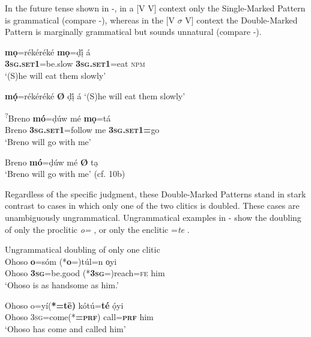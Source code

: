 \documentclass[output=paper]{langsci/langscibook}
\begin{document}
In the future tense shown in -, in a [V V] context only the Single-Marked Pattern is grammatical (compare -), whereas in the [V $\sigma $ V] context the Double-Marked Pattern is marginally grammatical but sounds unnatural (compare -). 

\ea\label{ex:rolle:28}
\gll   *\textbf{mọ}=rékéréké    \textbf{mọ}=ḍị́       á    \\
     \textbf{\textsc{3sg.set1}}=be.slow  \textbf{\textsc{3sg}}\textbf{.}\textbf{\textsc{set1}}=eat  \textsc{npm}\\
\glt ‘(S)he will eat them slowly’
\z

\ea\label{ex:rolle:29}
 \textbf{mọ́}=rékéréké \textbf{Ø} ḍị́ á 
\glt ‘(S)he will eat them slowly’
\z

\ea\label{ex:rolle:30}
\gll   \textsuperscript{?}Breno  \textbf{mó}=ḍúw    mé   \textbf{mọ}=tá    \\
     Breno     \textbf{\textsc{3sg.set1}}=follow  me  \textbf{\textsc{3sg.set1=}}go\\
\glt ‘Breno will go with me’
\z

\ea\label{ex:rolle:31}
   Breno \textbf{mó}=ḍúw mé \textbf{Ø} tạ\\
\glt ‘Breno will go with me’ (cf. 10b)
\z

Regardless of the specific judgment, these Double-Marked Patterns stand in stark contrast to cases in which only one of the two clitics is doubled. These cases are unambiguously ungrammatical. Ungrammatical examples in - show the doubling of only the proclitic \textit{o=} , or only the enclitic =\textit{te} . 

\ea\label{ex:rolle:32}
{Ungrammatical doubling of only one clitic}\\
\gll   Ohoso   \textbf{o}=sóm       (*\textbf{o}=)túl=n       o̩yi\\
       Ohoso  \textbf{\textsc{3sg}}=be.good   (*\textbf{\textsc{3sg}}=)reach=\textsc{fe}     him\\
\glt ‘Ohoso is as handsome as him.’
\z

\ea\label{ex:rolle:33}
\gll   Ohoso  o=yí(\textbf{*=tē)}      kótú=\textbf{té}    ọ́yi\\
       Ohoso  \textsc{3sg}=come(*\textbf{=}\textbf{\textsc{prf}})  call=\textbf{\textsc{prf}}    him\\
\glt ‘Ohoso has come and called him’ \citep[285]{Kari2003a}
\z
\end{document}
